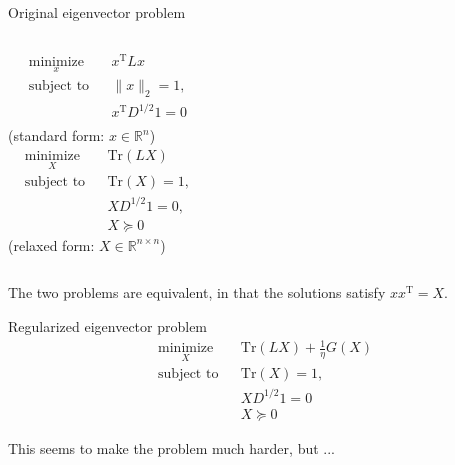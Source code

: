 \documentclass[xcolor=dvipsnames]{beamer}
\begin{document}
\begin{frame}
  \begin{block}{Original eigenvector problem}
  \begin{columns}
    \begin{equation*}
    \begin{aligned}
    & \underset{x}{\text{minimize}}
    & & x^\mathrm{T} L x \\
    & \text{subject to}
    & & \| x \|_2 = 1, \\
    & & & x^\mathrm{T} D^{1/2} 1 = 0 \\
    & & &
    \end{aligned}
    \end{equation*}
    (standard form: $x \in \mathbb{R}^{n}$)
    \begin{equation*}
    \begin{aligned}
    & \underset{X}{\text{minimize}}
    & & \mathrm{Tr}(L X)\\
    & \text{subject to}
    & & \mathrm{Tr}(X) = 1, \\
    & & & X D^{1/2} 1 = 0, \\
    & & & X \succeq 0
    \end{aligned}
    \end{equation*}
    (relaxed form: $X \in \mathbb{R}^{n \times n}$)
  \end{columns}
  \end{block}
  The two problems are equivalent, in that the solutions
  satisfy $x x^\mathrm{T} = X$.
\end{frame}

\begin{frame}
  \begin{block}{Regularized eigenvector problem}
    \begin{equation*}
    \begin{aligned}
    & \underset{X}{\text{minimize}}
    & & \mathrm{Tr}(L X) + \tfrac{1}{\eta} G(X) \\
    & \text{subject to}
    & & \mathrm{Tr}(X) = 1, \\
    & & & X D^{1/2} 1 = 0 \\
    & & & X \succeq 0
    \end{aligned}
    \end{equation*}
  \end{block}
  This seems to make the problem much harder, but ...
\end{frame}
\end{document}
